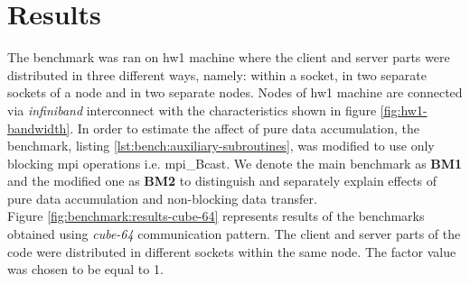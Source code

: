 \section{Results}
\label{sec:accumulator-results}


The benchmark was ran on \gls{hw1} machine where the client and server parts were distributed in three different ways, namely: within a socket, in two separate sockets of a node and in two separate nodes. Nodes of \gls{hw1} machine are connected via \textit{infiniband} interconnect with the characteristics shown in figure \ref{fig:hw1-bandwidth}. In order to estimate the affect of pure data accumulation, the benchmark, listing \ref{lst:bench:auxiliary-subroutines}, was modified to use only blocking \gls{mpi} operations i.e. \gls{mpi}\_Bcast. We denote the main benchmark as \textbf{BM1} and the modified one as \textbf{BM2} to distinguish and separately explain effects of pure data accumulation and non-blocking data transfer.\\


Figure \ref{fig:benchmark:results-cube-64} represents results of the benchmarks obtained using \textit{cube-64} communication pattern. The client and server parts of the code were distributed in different sockets within the same node. The factor value was chosen to be equal to 1.\\


